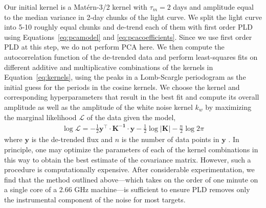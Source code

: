 \documentclass[]{emulateapj}
\begin{document}
Our initial kernel is a Mat\'ern-3/2 kernel with $\tau_m = 2$ days and amplitude
equal to the median variance in 2-day chunks of the light curve. We split the light curve
into 5-10 roughly equal chunks and de-trend each of them with first order PLD
using Equations~\ref{eq:pcamodel} and \ref{eq:pcacoefficients}. Since we use first order
PLD at this step, we do not perform PCA here. We then compute the 
autocorrelation function of the de-trended data and perform least-squares fits
on different additive and multiplicative combinations of the kernels in Equation~\ref{eq:kernels}, using
the peaks in a Lomb-Scargle periodogram as the initial
guess for the periods in the cosine kernels. We choose the kernel and corresponding
hyperparameters that result in the best fit and compute its overall amplitude
as well as the amplitude of the white noise kernel $k_w$
by maximizing the marginal likelihood $\mathcal{L}$ of the data given the model,
\begin{align}
\label{eq:like}
\log\mathcal{L} = -\frac{1}{2}\mathbf{y}^\top\cdot\mathbf{K^{-1}}\cdot\mathbf{y} - \frac{1}{2}\log\left|\mathbf{K}\right| - \frac{n}{2}\log 2\pi
\end{align}
where $\mathbf{y}$ is the de-trended flux and $n$ is the number of data points 
in $\mathbf{y}$ \citep{RW06}. In principle, one may optimize the parameters of each
of the kernel combinations in this way to obtain the best estimate of the covariance
matrix. However, such a procedure is computationally expensive. After considerable
experimentation, we find that the method outlined above---which takes on the order of one
minute on a single core of a 2.66 GHz machine---is sufficient to ensure PLD removes
only the instrumental component of the noise for most targets.
\end{document}
